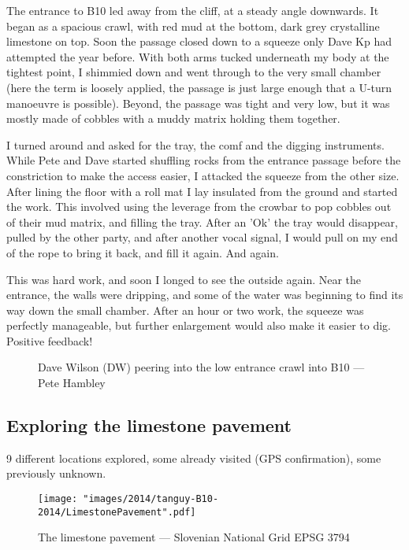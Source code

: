 The entrance to B10 led away from the cliff, at a steady angle downwards. It began as a spacious crawl, with red mud at the bottom, dark grey crystalline limestone on top. Soon the passage closed down to a squeeze only Dave Kp had attempted the year before. With both arms tucked underneath my body at the tightest point, I shimmied down and went through to the very small chamber (here the term is loosely applied, the passage is just large enough that a U-turn manoeuvre is possible). Beyond, the passage was tight and very low, but it was mostly made of cobbles with a muddy matrix holding them together. 

I turned around and asked for the tray, the comf and the digging instruments. While Pete and Dave started shuffling rocks from the entrance passage before the constriction to make the access easier, I attacked the squeeze from the other size. After lining the floor with a roll mat I lay insulated from the ground and started the work. This involved using the leverage from the crowbar to pop cobbles out of their mud matrix, and filling the tray. After an 'Ok' the tray would disappear, pulled by the other party, and after another vocal signal, I would pull on my end of the rope to bring it back, and fill it again. And again. 

This was hard work, and soon I longed to see the outside again. Near the entrance, the walls were dripping, and some of the water was beginning to find its way down the small chamber. After an hour or two work, the squeeze was perfectly manageable, but further enlargement would also make it easier to dig. Positive feedback!

\begin{figure*}[t!]
	\checkoddpage \ifoddpage \forcerectofloat \else \forceversofloat \fi
	\centering
	\label{stalactites Atlantis}
	\caption{Dave Wilson (DW) peering into the low entrance crawl into B10 --- Pete Hambley}
\end{figure*}


\subsection{Exploring the limestone pavement}
9 different locations explored, some already visited (GPS confirmation), some previously unknown.

\begin{figure}[t!]
	\checkoddpage \ifoddpage \forcerectofloat \else \forceversofloat \fi
	\centering
	
	\texttt{[image: "images/2014/tanguy-B10-2014/LimestonePavement".pdf]}
	
	\label{stalactites Atlantis}
	\caption{The limestone pavement --- Slovenian National Grid EPSG 3794}
\end{figure}



